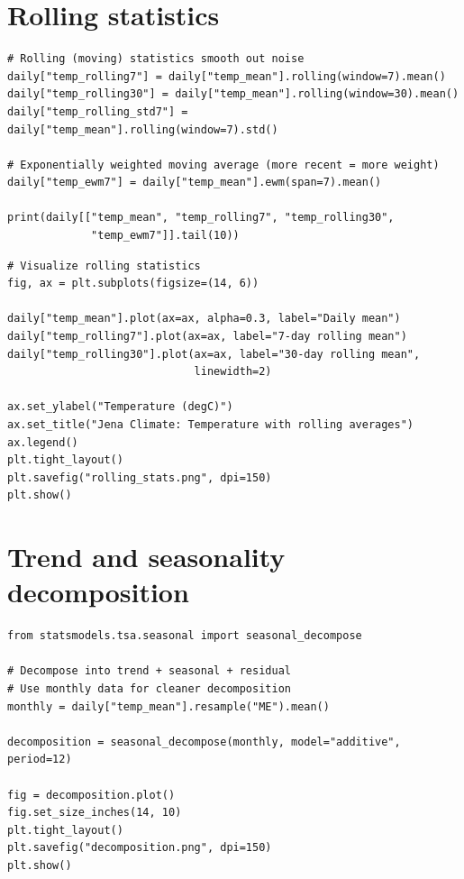 \section{Rolling statistics}

\begin{verbatim}
# Rolling (moving) statistics smooth out noise
daily["temp_rolling7"] = daily["temp_mean"].rolling(window=7).mean()
daily["temp_rolling30"] = daily["temp_mean"].rolling(window=30).mean()
daily["temp_rolling_std7"] = daily["temp_mean"].rolling(window=7).std()

# Exponentially weighted moving average (more recent = more weight)
daily["temp_ewm7"] = daily["temp_mean"].ewm(span=7).mean()

print(daily[["temp_mean", "temp_rolling7", "temp_rolling30",
             "temp_ewm7"]].tail(10))
\end{verbatim}

\begin{verbatim}
# Visualize rolling statistics
fig, ax = plt.subplots(figsize=(14, 6))

daily["temp_mean"].plot(ax=ax, alpha=0.3, label="Daily mean")
daily["temp_rolling7"].plot(ax=ax, label="7-day rolling mean")
daily["temp_rolling30"].plot(ax=ax, label="30-day rolling mean",
                             linewidth=2)

ax.set_ylabel("Temperature (degC)")
ax.set_title("Jena Climate: Temperature with rolling averages")
ax.legend()
plt.tight_layout()
plt.savefig("rolling_stats.png", dpi=150)
plt.show()
\end{verbatim}

\section{Trend and seasonality decomposition}

\begin{verbatim}
from statsmodels.tsa.seasonal import seasonal_decompose

# Decompose into trend + seasonal + residual
# Use monthly data for cleaner decomposition
monthly = daily["temp_mean"].resample("ME").mean()

decomposition = seasonal_decompose(monthly, model="additive", period=12)

fig = decomposition.plot()
fig.set_size_inches(14, 10)
plt.tight_layout()
plt.savefig("decomposition.png", dpi=150)
plt.show()
\end{verbatim}

